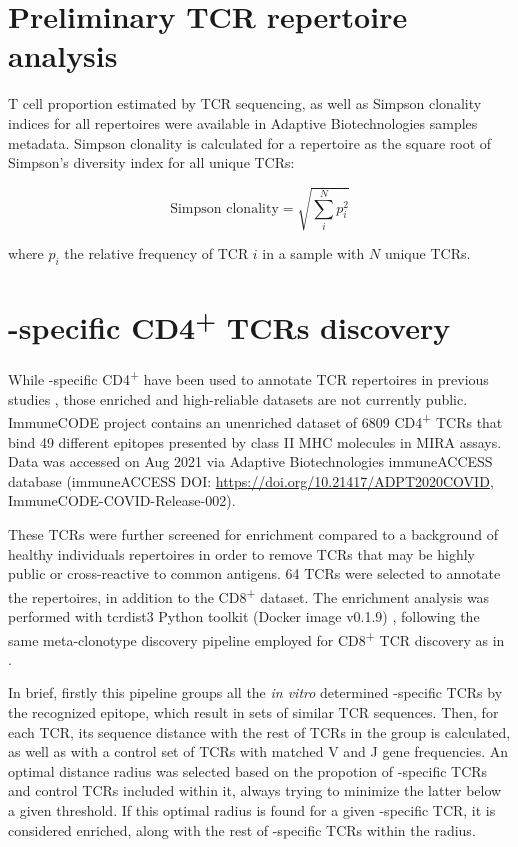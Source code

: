 \section*{Preliminary TCR repertoire analysis}


T cell proportion estimated by TCR sequencing, as well as Simpson clonality indices for all repertoires were available in Adaptive Biotechnologies samples metadata. Simpson clonality is calculated for a repertoire as the square root of Simpson’s diversity index for all unique TCRs:


\[ \mbox{Simpson clonality} = \sqrt{\sum_{i}^N p_{i}^2} \]

where $p_{i}$ the relative frequency of TCR $i$ in a sample with $N$ unique TCRs.


\section*{\covid-specific CD4\textsuperscript{+} TCRs discovery}


While \covid-specific CD4\textsuperscript{+} have been used to annotate TCR repertoires in previous studies \citep{janssen, snyderdiagnosis}, those enriched and high-reliable datasets are not currently public. ImmuneCODE\texttrademark{} project contains an unenriched dataset of 6809 CD4\textsuperscript{+} TCRs that bind 49 different \covid{} epitopes presented by class II MHC molecules in MIRA assays. Data was accessed on Aug 2021 via Adaptive Biotechnologies immuneACCESS\textregistered{} database (immuneACCESS\textregistered{} DOI: \url{https://doi.org/10.21417/ADPT2020COVID}, ImmuneCODE-COVID-Release-002).

These TCRs were further screened for enrichment compared to a background of healthy individuals repertoires in order to remove TCRs that may be highly public or cross-reactive to common antigens. 64 TCRs were selected to annotate the repertoires, in addition to the CD8\textsuperscript{+} dataset. The enrichment analysis was performed with tcrdist3 Python toolkit (Docker image v0.1.9) \citep{metaclonotypes, tcrdist}, following the same meta-clonotype discovery pipeline employed for \covid{} CD8\textsuperscript{+} TCR discovery as in \cite{metaclonotypes}.

In brief, firstly this pipeline groups all the \textit{in vitro} determined \covid-specific TCRs by the recognized epitope, which result in sets of similar TCR sequences. Then, for each TCR, its sequence distance with the rest of TCRs in the group is calculated, as well as with a control set of TCRs with matched V and J gene frequencies. An optimal distance radius was selected based on the propotion of \covid-specific TCRs and control TCRs included within it, always trying to minimize the latter below a given threshold. If this optimal radius is found for a given \covid-specific TCR, it is considered enriched, along with the rest of \covid-specific TCRs within the radius.



